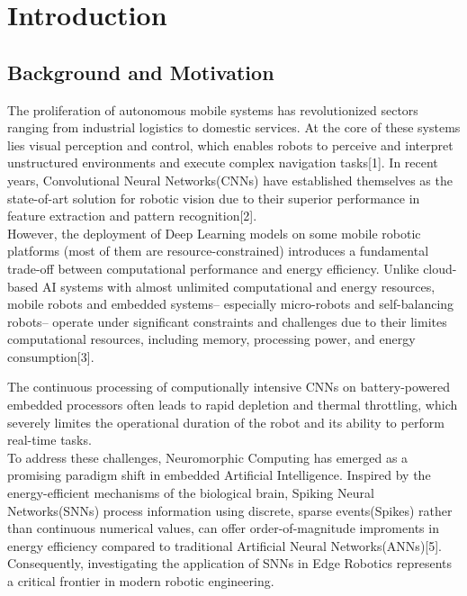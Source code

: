 \section{Introduction}

\subsection{Background and Motivation}
The proliferation of autonomous mobile systems has revolutionized sectors
ranging from industrial logistics to domestic services. At the core of these 
systems lies visual perception and control, which enables robots to perceive and 
interpret unstructured environments and execute complex navigation tasks[1]. In recent
years, Convolutional Neural Networks(CNNs) have established themselves as the state-of-art solution
for robotic vision due to their superior performance in feature extraction 
and pattern recognition[2].\\

However, the deployment of Deep Learning models on some mobile robotic platforms
(most of them are resource-constrained) introduces a fundamental trade-off between 
computational performance and energy efficiency. Unlike cloud-based AI systems with
almost unlimited computational and energy resources, mobile robots and 
embedded systems-- especially micro-robots and self-balancing robots-- 
operate under significant constraints and challenges due to their limites computational resources,
including memory, processing power, and energy consumption[3].

The continuous processing of 
computionally intensive CNNs on battery-powered embedded processors often leads to
rapid depletion and thermal throttling, which severely limites the operational duration
of the robot and its ability to perform real-time tasks.\\

To address these challenges, Neuromorphic Computing has emerged as a promising paradigm
shift in embedded Artificial Intelligence. Inspired by the energy-efficient mechanisms
of the biological brain, Spiking Neural Networks(SNNs) process information using discrete,
sparse events(Spikes) rather than continuous numerical values, can offer
order-of-magnitude improments in energy efficiency compared to traditional Artificial Neural
Networks(ANNs)[5]. Consequently, investigating the application of SNNs in Edge Robotics
represents a critical frontier in modern robotic engineering.

